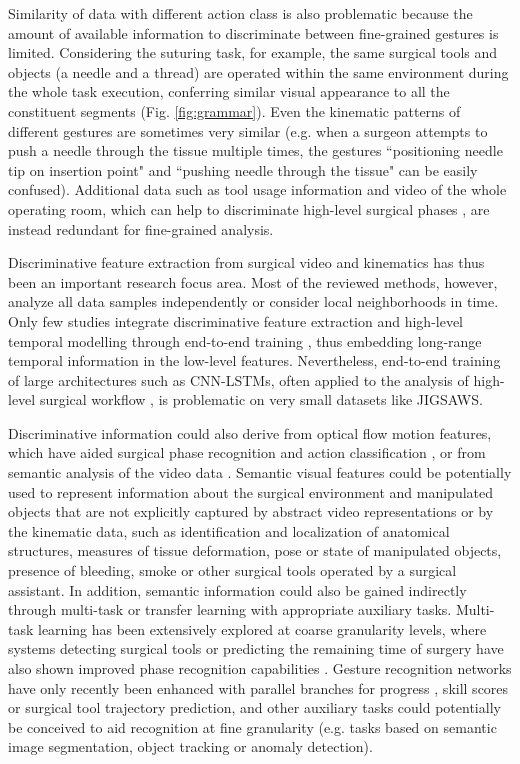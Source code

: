 \documentclass[journal]{IEEEtran}
\begin{document}
Similarity of data with different action class is also problematic because the amount of available information to discriminate between fine-grained gestures is limited.
Considering the suturing task, for example, the same surgical tools and objects (a needle and a thread) are operated within the same environment during the whole task execution, conferring similar visual appearance to all the constituent segments (Fig. \ref{fig:grammar}). Even the kinematic patterns of different gestures are sometimes very similar (e.g. when a surgeon attempts to push a needle through the tissue multiple times, the gestures ``positioning needle tip on insertion point" and ``pushing needle through the tissue" can be easily confused). Additional data such as tool usage information and video of the whole operating room, which can help to discriminate high-level surgical phases \cite{Twinanda2017}, are instead redundant for fine-grained analysis. 

Discriminative feature extraction from surgical video and kinematics has thus been an important research focus area. Most of the reviewed methods, however, analyze all data samples independently or consider local neighborhoods in time. 
Only few studies integrate discriminative feature extraction and high-level temporal modelling through end-to-end training \cite{Mavroudi2018}, thus embedding long-range temporal information in the low-level features. 
Nevertheless, end-to-end training of large architectures such as CNN-LSTMs, often applied to the analysis of high-level surgical workflow \cite{Yu2018, Yengera2018}, is problematic on very small datasets like JIGSAWS.

Discriminative information could also derive from optical flow motion features, which have aided surgical phase recognition \cite{Quellec2014} and action classification \cite{Simonyan2015, Sarikaya2019}, or from semantic analysis of the video data \cite{Lea2015semantic}. 
Semantic visual features could be potentially used to represent information about the surgical environment and manipulated objects that are not explicitly captured by abstract video representations or by the kinematic data, such as identification and localization of anatomical structures, measures of tissue deformation, pose or state of manipulated objects, presence of bleeding, smoke or other surgical tools operated by a surgical assistant.
In addition, semantic information could also be gained indirectly through multi-task or transfer learning with appropriate auxiliary tasks. Multi-task learning has been extensively explored at coarse granularity levels, where systems detecting surgical tools or predicting the remaining time of surgery have also shown improved phase recognition capabilities \cite{Twinanda2017, Mondal2019, Li2017}. 
Gesture recognition networks have only recently been enhanced with parallel branches for progress \cite{VanAmsterdam2020}, skill scores \cite{Wang2020} or surgical tool trajectory \cite{Qin2020b} prediction, and other auxiliary tasks could potentially be conceived to aid recognition at fine granularity (e.g. tasks based on semantic image segmentation, object tracking or anomaly detection).
\end{document}
